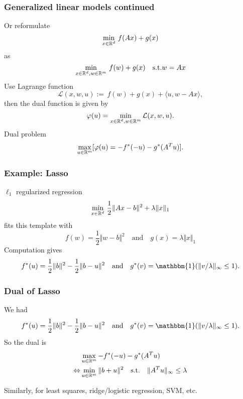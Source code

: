 \documentclass[aspectratio=149]{beamer}
\begin{document}
\begin{frame}
  \frametitle{Generalized linear models continued}
  Or reformulate
  \begin{equation}
    \min_{x\in \mathbb{R}^d} \, f(Ax) + g(x)
  \end{equation}
  as
  \begin{equation}
    \min_{x\in\mathbb{R}^d, w\in \mathbb{R}^m} \, f(w)+ g(x) \quad \text{s.t.} w = Ax
  \end{equation}
  Use Lagrange function
  \begin{equation}
    \mathcal{L}(x,w, u) :=  \, f(w)+ g(x) + \langle u, w - Ax \rangle,
  \end{equation}
  then the dual function is given by
  \begin{equation}
    \varphi(u) = \min_{x\in\mathbb{R}^d, w\in \mathbb{R}^m} \mathcal{L}(x,w,u).
  \end{equation}
  Dual problem
  \begin{equation}
    \max_{u \in \mathbb{R}^m} [\varphi(u) = - f^*(-u) - g^*(A^T u)].
  \end{equation}
\end{frame}


\begin{frame}
  \frametitle{Example: Lasso}
  $\ell_1$ regularized regression
  \begin{equation}
    \min_{x\in \mathbb{R}^d}\, \frac12 \Vert Ax-b \Vert^2 + \lambda \Vert x \Vert_1
  \end{equation}
  fits this template with
  \begin{equation}
    f(w) = \frac12 \Vert w-b \Vert^2 \quad \text{and} \quad g(x) = \lambda \Vert x \Vert_1
  \end{equation}
  Computation gives
  \begin{equation}
    f^*(u) = \frac12 \Vert b \Vert^2 - \frac12 \Vert b-u \Vert^2 \quad \text{and} \quad g^*(v)= \mathbbm{1}(\Vert v/\lambda \Vert_\infty \le 1).
  \end{equation}
\end{frame}

\begin{frame}
  \frametitle{Dual of Lasso}
  We had
  \begin{equation}
    f^*(u) = \frac12 \Vert b \Vert^2 - \frac12 \Vert b-u \Vert^2 \quad \text{and} \quad g^*(v)= \mathbbm{1}(\Vert v/\lambda \Vert_\infty \le 1).
  \end{equation}
  So the dual is
  \begin{equation}
    \begin{aligned}
      &\max_{u\in \mathbb{R}^m} - f^*(-u) - g^*(A^T u) \\
      \Leftrightarrow& \min_{u\in\mathbb{R}^m} \Vert b+u \Vert^2 \quad \text{s.t.} \quad \Vert A^T u \Vert_{\infty} \le \lambda
    \end{aligned}
  \end{equation}

  Similarly, for least squares, ridge/logistic regression, SVM, etc.
\end{frame}
\end{document}
